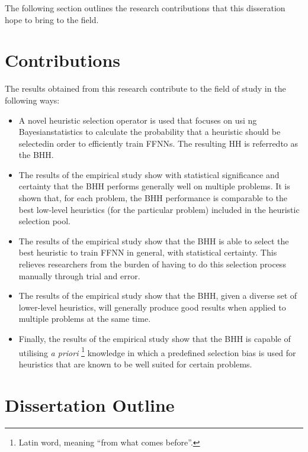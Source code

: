 The following section outlines the research contributions that this disseration hope to bring to the field.


\section{Contributions}\label{sec:introduction:contributions}

The results obtained from this research contribute to the field of study in the
following ways:

\begin{itemize}
      \item A novel heuristic selection operator is used that focuses on usi ng Bayesianstatistics to calculate the probability that a heuristic should be selectedin order to efficiently train \acp{FFNN}. The resulting \ac{HH} is referredto as the \Acl{BHH}.

      \item The results of the empirical study show with statistical significance and certainty that the \Ac{BHH} performs generally well on multiple problems. It is shown that, for each problem, the \Ac{BHH} performance is comparable to the best low-level heuristics (for the particular problem) included in the heuristic selection pool.

      \item The results of the empirical study show that the \Ac{BHH} is able to select the best heuristic to train \ac{FFNN} in general, with statistical certainty. This relieves researchers from the burden of having to do this selection process manually through trial and error.

      \item The results of the empirical study show that the \Ac{BHH}, given a diverse set of lower-level heuristics, will generally produce good results when applied to multiple problems at the same time.

      \item Finally, the results of the empirical study show that the \Ac{BHH} is capable of utilising \textit{a priori} \footnote{Latin word, meaning ``from what comes before''.} knowledge in which a predefined selection bias is used for heuristics that are known to be well suited for certain problems.
\end{itemize}


\section{Dissertation Outline}\label{sec:introduction:outline}

